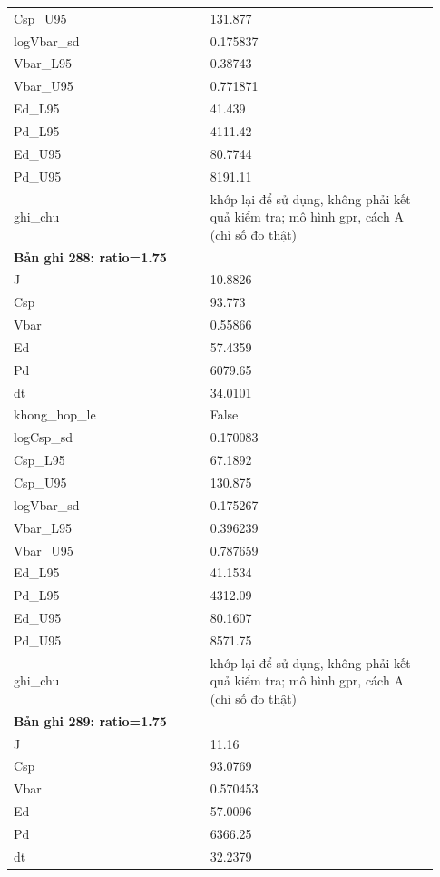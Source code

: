 \begin{longtable}{p{0.43\linewidth}p{0.50\linewidth}}
Csp\_\allowbreak U95 & 131.877 \\
logVbar\_\allowbreak sd & 0.175837 \\
Vbar\_\allowbreak L95 & 0.38743 \\
Vbar\_\allowbreak U95 & 0.771871 \\
Ed\_\allowbreak L95 & 41.439 \\
Pd\_\allowbreak L95 & 4111.42 \\
Ed\_\allowbreak U95 & 80.7744 \\
Pd\_\allowbreak U95 & 8191.11 \\
ghi\_\allowbreak chu & khớp lại để sử dụng, không phải kết quả kiểm tra; mô hình gpr, cách A (chỉ số đo thật) \\
\midrule
\multicolumn{2}{p{0.95\linewidth}}{\textbf{Bản ghi 288: ratio=1.75}} \\
J & 10.8826 \\
Csp & 93.773 \\
Vbar & 0.55866 \\
Ed & 57.4359 \\
Pd & 6079.65 \\
dt & 34.0101 \\
khong\_\allowbreak hop\_\allowbreak le & False \\
logCsp\_\allowbreak sd & 0.170083 \\
Csp\_\allowbreak L95 & 67.1892 \\
Csp\_\allowbreak U95 & 130.875 \\
logVbar\_\allowbreak sd & 0.175267 \\
Vbar\_\allowbreak L95 & 0.396239 \\
Vbar\_\allowbreak U95 & 0.787659 \\
Ed\_\allowbreak L95 & 41.1534 \\
Pd\_\allowbreak L95 & 4312.09 \\
Ed\_\allowbreak U95 & 80.1607 \\
Pd\_\allowbreak U95 & 8571.75 \\
ghi\_\allowbreak chu & khớp lại để sử dụng, không phải kết quả kiểm tra; mô hình gpr, cách A (chỉ số đo thật) \\
\midrule
\multicolumn{2}{p{0.95\linewidth}}{\textbf{Bản ghi 289: ratio=1.75}} \\
J & 11.16 \\
Csp & 93.0769 \\
Vbar & 0.570453 \\
Ed & 57.0096 \\
Pd & 6366.25 \\
dt & 32.2379 \\

\end{longtable}

